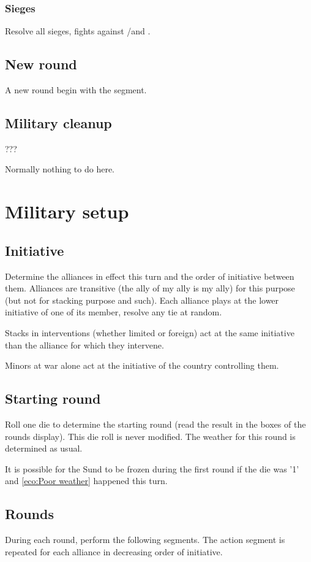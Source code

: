 \subsubsection{Sieges}
Resolve all sieges, fights against \REVOLT/\REBELLION and \corsaire.

\subsection{New round}
A new round begin with the  segment.

\subsection{Military cleanup}
???

Normally nothing to do here.


\section{Military setup}
\subsection{Initiative}
Determine the alliances in effect this turn and the order of initiative
between them. Alliances are transitive (the ally of my ally is my ally) for
this purpose (but not for stacking purpose and such). Each alliance plays at
the lower initiative of one of its member, resolve any tie at random.

Stacks in interventions (whether limited or foreign) act at the same
initiative than the alliance for which they intervene.

Minors at war alone act at the initiative of the country controlling them.

\subsection{Starting round}
Roll one die to determine the starting round (read the result in the boxes of
the rounds display). This die roll is never modified. The weather for this
round is determined as usual.

It is possible for the Sund to be frozen during the first round if the die was
'1' and \ref{eco:Poor weather} happened this turn.

\subsection{Rounds}
During each round, perform the following segments. The action segment is
repeated for each alliance in decreasing order of initiative.

